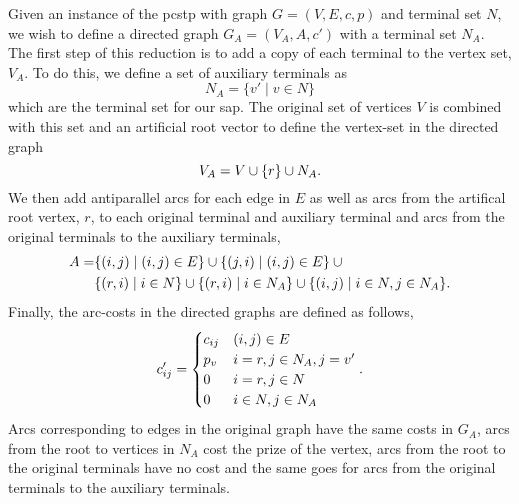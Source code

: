 Given an instance of the \gls{pcstp} with graph $G = (V,E,c,p)$ and terminal set $N$, we wish to define
 a directed graph $G_A = (V_A, A, c')$ with a terminal set $N_A$. The first
 step of this reduction is to add a copy of each terminal to the vertex set, $V_A$.
 To do this, we define a
set of auxiliary terminals as
$$N_A = \{v' \mid v \in N\}$$
which are the terminal set for our \gls{sap}.
The original set of vertices $V$ is combined with this set and an
artificial root vector to define the vertex-set in the directed graph
$$V_A = V \cup \{r\} \cup N_A\mathnormal{.}$$
We then add antiparallel arcs for each edge in $E$ as well as arcs from the artifical root vertex, $r$,
to each original terminal and auxiliary terminal and arcs from the original terminals to the auxiliary
terminals,
\begin{align*}
A = &\{(i,j) \mid (i,j) \in E \} \cup \{ (j,i) \mid (i,j) \in E \} \:\cup \\
&\{(r, i) \mid i \in N\} \cup \{(r,i) \mid i \in N_A\} \cup \{(i,j) \mid i \in N, j \in N_A\}\mathnormal{.}
\end{align*}
Finally, the arc-costs in the directed graphs are defined as follows,
$$c'_{ij} =
\begin{cases}
  c_{ij} & (i,j) \in E \\
  p_v & i = r, j \in N_A , j = v' \\
  0 & i = r, j \in N \\
  0 & i \in N, j \in N_A
\end{cases}\textnormal{.}$$
Arcs corresponding to edges in the original graph have the same costs in $G_A$, arcs from the root
to vertices in $N_A$ cost the prize of the vertex, arcs from the root to the original terminals
have no cost and the same goes for arcs from the original terminals to the auxiliary terminals.

